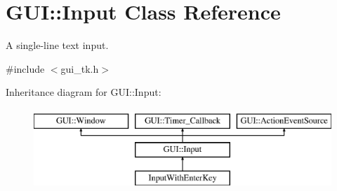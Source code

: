 \hypertarget{classGUI_1_1Input}{\section{G\-U\-I\-:\-:Input Class Reference}
\label{classGUI_1_1Input}
}


A single-\/line text input.  




{\ttfamily \#include $<$gui\-\_\-tk.\-h$>$}

Inheritance diagram for G\-U\-I\-:\-:Input\-:\begin{figure}[H]
\begin{center}
\leavevmode
\includegraphics[height=3.000000cm]{classGUI_1_1Input}
\end{center}
\end{figure}
